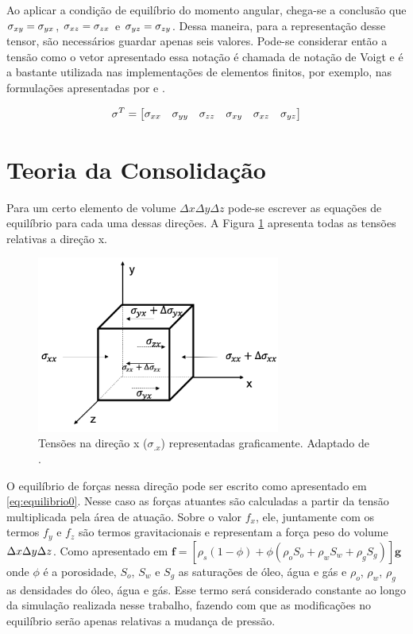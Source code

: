Ao aplicar a condição de equilíbrio do momento angular, chega-se a conclusão que $\sigma_{xy}=\sigma_{yx}$, $\sigma_{xz}=\sigma_{zx}$ e $\sigma_{yz}=\sigma_{zy}$. Dessa maneira, para a representação desse tensor, são necessários guardar apenas seis valores. Pode-se considerar então a tensão como o vetor apresentado \label{eq:tensor6} essa notação é chamada de notação de Voigt e é a bastante utilizada nas implementações de elementos finitos, por exemplo, nas formulações apresentadas por \cite{hughes} e \cite{jacob}.


\begin{equation}
\sigma^T = \begin{bmatrix}
\sigma_{xx} & \sigma_{yy} & \sigma_{zz} & \sigma_{xy} & \sigma_{xz} & \sigma_{yz}
\end{bmatrix}
\label{eq:tensor6}
\end{equation}


\section{Teoria da Consolidação}

Para um certo elemento de volume $\Delta x\Delta y \Delta z$ pode-se escrever as equações de equilíbrio para cada uma dessas direções. A Figura \ref{fig:equilibrio} apresenta todas as tensões relativas a direção x.

\begin{figure}[!htbp]
\centering
\includegraphics[width=8cm]{chap01/figs/equilibrio.png}
\caption{Tensões na direção x ($\sigma_{.x}$) representadas graficamente.  Adaptado de \cite{CompGeomec}.}
\label{fig:equilibrio}
\end{figure}

O equilíbrio de forças nessa direção pode ser escrito como apresentado em \eqref{eq:equilibrio0}. Nesse caso as forças atuantes são calculadas a partir da tensão multiplicada pela área de atuação. Sobre o valor $f_x$, ele, juntamente com os termos $f_y$ e $f_z$  são termos gravitacionais e representam a força peso do volume $\Delta x\Delta y\Delta z$. Como apresentado em \citet{xiuligai} $\mathbf{f} = [\rho_s(1-\phi) + \phi(\rho_o S_o + \rho_w S_w + \rho_g S_g )] \mathbf{g}$ onde $\phi$ é a porosidade, $S_o$, $S_w$ e $S_g$ as saturações de óleo, água e gás e $\rho_o$, $\rho_w$, $\rho_g$  as densidades do óleo, água e gás. Esse termo será considerado constante ao longo da simulação realizada nesse trabalho, fazendo com que as modificações no equilíbrio serão apenas relativas a mudança de pressão.


